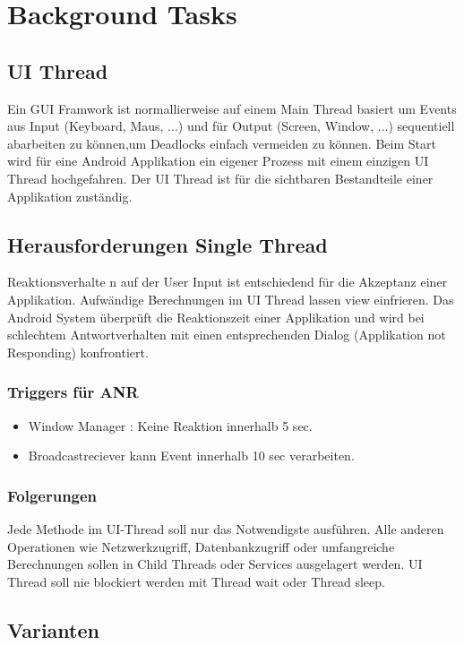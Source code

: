 \documentclass[a4paper,10pt,titlepage=false]{scrreprt}
\begin{document}
\chapter{Background Tasks}

\section{UI Thread}
Ein GUI Framwork ist normallierweise auf einem Main Thread basiert um Events aus Input (Keyboard, Maus, ...) und für
Output (Screen, Window, ...) sequentiell abarbeiten zu können,um Deadlocks einfach vermeiden zu können. Beim Start wird für eine Android Applikation ein eigener Prozess mit einem einzigen UI Thread hochgefahren. Der UI Thread ist für die sichtbaren Bestandteile einer Applikation zuständig.

\section{Herausforderungen Single Thread}
Reaktionsverhalte n auf der User Input ist entschiedend für die Akzeptanz einer Applikation. Aufwändige Berechnungen im UI Thread lassen view einfrieren.
Das Android System überprüft die Reaktionszeit einer Applikation und wird bei schlechtem Antwortverhalten mit einen entsprechenden Dialog (Applikation not Responding) konfrontiert.

\subsection{Triggers für ANR}
\begin{itemize}
 \item Window Manager : Keine Reaktion innerhalb 5 sec. 
 \item Broadcastreciever kann Event innerhalb 10 sec verarbeiten.
\end{itemize}

\subsection{Folgerungen}
Jede Methode im UI-Thread soll nur das
Notwendigste ausführen. Alle anderen
Operationen wie Netzwerkzugriff,
Datenbankzugriff oder umfangreiche
Berechnungen sollen in Child Threads oder
Services ausgelagert werden. UI Thread soll nie blockiert werden mit Thread wait oder Thread sleep.


\section{Varianten}
\end{document}
